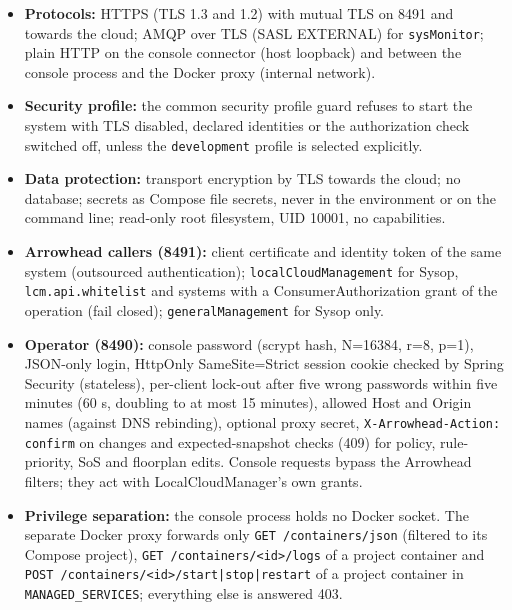\documentclass[a4paper]{arrowhead}
\begin{document}
\begin{itemize}
  \item \textbf{Protocols:} HTTPS (TLS 1.3 and 1.2) with mutual TLS on 8491 and towards the cloud; AMQP over TLS (SASL EXTERNAL) for \texttt{sysMonitor}; plain HTTP on the console connector (host loopback) and between the console process and the Docker proxy (internal network).
  \item \textbf{Security profile:} the common security profile guard refuses to start the system with TLS disabled, declared identities or the authorization check switched off, unless the \texttt{development} profile is selected explicitly.
  \item \textbf{Data protection:} transport encryption by TLS towards the cloud; no database; secrets as Compose file secrets, never in the environment or on the command line; read-only root filesystem, UID 10001, no capabilities.
  \item \textbf{Arrowhead callers (8491):} client certificate and identity token of the same system (outsourced authentication); \texttt{local\allowbreak{}Cloud\allowbreak{}Management} for Sysop, \texttt{lcm.\allowbreak{}api.\allowbreak{}whitelist} and systems with a ConsumerAuthorization grant of the operation (fail closed); \texttt{general\allowbreak{}Management} for Sysop only.
  \item \textbf{Operator (8490):} console password (scrypt hash, N=16384, r=8, p=1), JSON-only login, HttpOnly SameSite=Strict session cookie checked by Spring Security (stateless), per-client lock-out after five wrong passwords within five minutes (60 s, doubling to at most 15 minutes), allowed Host and Origin names (against DNS rebinding), optional proxy secret, \texttt{X-\allowbreak{}Arrowhead-\allowbreak{}Action:\allowbreak{} confirm} on changes and expected-snapshot checks (409) for policy, rule-priority, SoS and floorplan edits. Console requests bypass the Arrowhead filters; they act with LocalCloudManager's own grants.
  \item \textbf{Privilege separation:} the console process holds no Docker socket. The separate Docker proxy forwards only \texttt{GET /\allowbreak{}containers/\allowbreak{}json} (filtered to its Compose project), \texttt{GET /\allowbreak{}containers/\allowbreak{}<id>/\allowbreak{}logs} of a project container and \texttt{POST /\allowbreak{}containers/\allowbreak{}<id>/\allowbreak{}start|stop|restart} of a project container in \texttt{MANAGED\_\allowbreak{}SERVICES}; everything else is answered 403.
\end{itemize}
\end{document}
